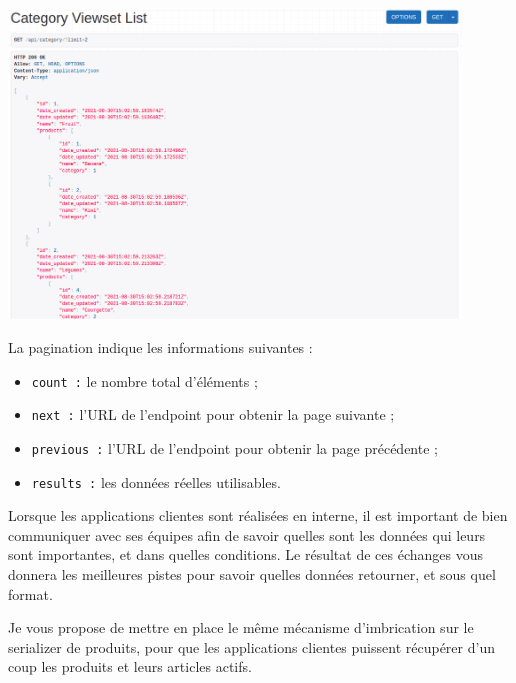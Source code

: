 \documentclass[a4paper]{article}
\begin{document}
\begin{center}
\includegraphics[width=12cm]{images/image14.png}
\end{center}
La pagination indique les informations suivantes :
\begin{itemize}
\item {\tt count  :} le nombre total d’éléments ;
\item {\tt next  :} l’URL de l’endpoint pour obtenir la page suivante ;
\item {\tt previous  :} l’URL de l’endpoint pour obtenir la page précédente ;
\item {\tt results  :} les données réelles utilisables.
\end{itemize}
\begin{theorem}
Lorsque les applications clientes sont réalisées en interne, il est important de bien communiquer avec ses équipes afin de savoir quelles sont les données qui leurs sont importantes, et dans quelles conditions. Le résultat de ces échanges vous donnera les meilleures pistes pour savoir quelles données retourner, et sous quel format.
\end{theorem}
Je vous propose de mettre en place le même mécanisme d’imbrication sur le serializer de produits, pour que les applications clientes puissent récupérer d’un coup les produits et leurs articles actifs.
\end{document}
